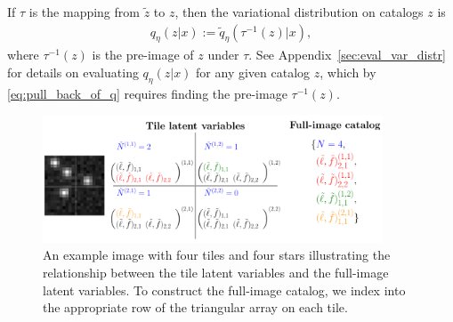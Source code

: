 If $\tau$ is the mapping from $\tilde z$ to $z$, 
then the variational distribution on catalogs $z$ is
\begin{align}
    q_\eta(z | x) := \tilde q_\eta(\tau^{-1}(z) | x),
    \label{eq:pull_back_of_q}
\end{align}
where $\tau^{-1}(z)$ is the pre-image of $z$ under $\tau$. 
See Appendix~\ref{sec:eval_var_distr} for details on evaluating $q_\eta(z | x)$ for any given catalog $z$, which by \eqref{eq:pull_back_of_q} requires finding the pre-image $\tau^{-1}(z)$.







\begin{figure}[tb]
    \centering
    \includegraphics[width = 0.9\textwidth]{figures/vi_figures/tile_to_full_schematic.png}
    \vspace{-0.6cm}
    \caption{An example image with four tiles and four stars illustrating the relationship between the tile latent variables and the full-image latent variables. 
    To construct the full-image catalog, we index into the appropriate row of the triangular array on each tile.}
    \label{fig:tile_to_full_schm}
\end{figure}


